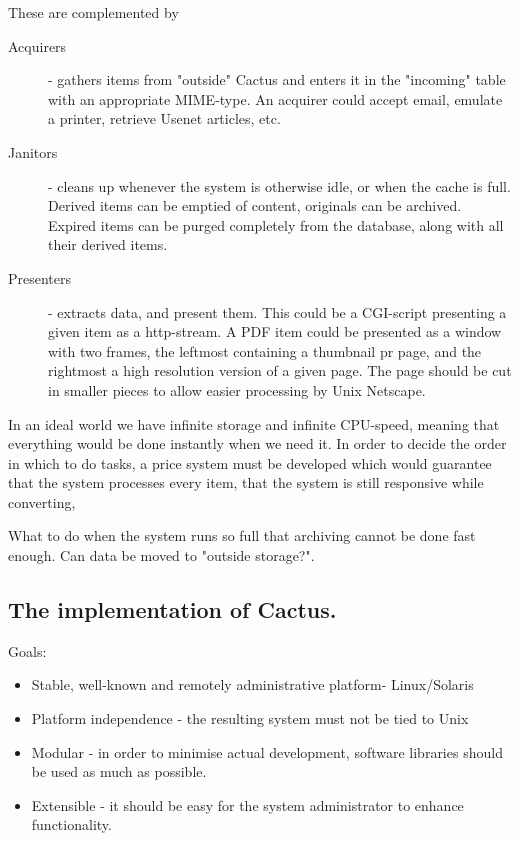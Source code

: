 These are complemented by

\begin{description}
\item[Acquirers] - gathers items from "outside" Cactus and enters it
  in the "incoming" table with an appropriate MIME-type.  An acquirer
  could accept email, emulate a printer, retrieve Usenet articles,
  etc.

\item[Janitors] - cleans up whenever the system is otherwise idle, or
  when the cache is full.  Derived items can be emptied of content,
  originals can be archived.  Expired items can be purged completely
  from the database, along with all their derived items.

\item[Presenters] - extracts data, and present them.  This could be a
  CGI-script presenting a given item as a http-stream.  A PDF item
  could be presented as a window with two frames, the leftmost
  containing a thumbnail pr page, and the rightmost a high resolution
  version of a given page.  The page should be cut in smaller pieces
  to allow easier processing by Unix Netscape.
\end{description}

In an ideal world we have infinite storage and infinite CPU-speed,
meaning that everything would be done instantly when we need it.  In
order to decide the order in which to do tasks, a price system must be
developed which would guarantee that the system processes every item,
that the system is still responsive while converting,


What to do when the system runs so full that archiving cannot be done
fast enough.  Can data be moved to "outside storage?".



\subsection{The implementation of Cactus.}



Goals:

\begin{itemize}
\item Stable, well-known and remotely administrative platform-
  Linux/Solaris
\item Platform independence - the resulting system must not be tied to
  Unix
 
\item Modular - in order to minimise actual development, software
  libraries should be used as much as possible.
  
\item Extensible - it should be easy for the system administrator to
  enhance functionality.
\end{itemize}

